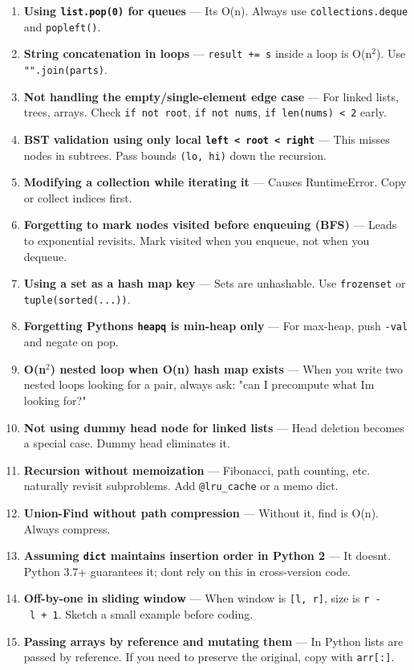 \documentclass[11pt]{article}
\begin{document}
\begin{enumerate}
\def\labelenumi{\arabic{enumi}.}
\item
  \textbf{Using \texttt{list.pop(0)} for queues} --- It\textquotesingle s O(n). Always use \texttt{collections.deque} and \texttt{popleft()}.
\item
  \textbf{String concatenation in loops} --- \texttt{result\ +=\ s} inside a loop is O(n\(^2\)). Use \texttt{"".join(parts)}.
\item
  \textbf{Not handling the empty/single-element edge case} --- For linked lists, trees, arrays. Check \texttt{if\ not\ root}, \texttt{if\ not\ nums}, \texttt{if\ len(nums)\ \textless{}\ 2} early.
\item
  \textbf{BST validation using only local \texttt{left\ \textless{}\ root\ \textless{}\ right}} --- This misses nodes in subtrees. Pass bounds \texttt{(lo,\ hi)} down the recursion.
\item
  \textbf{Modifying a collection while iterating it} --- Causes RuntimeError. Copy or collect indices first.
\item
  \textbf{Forgetting to mark nodes visited before enqueuing (BFS)} --- Leads to exponential revisits. Mark visited when you enqueue, not when you dequeue.
\item
  \textbf{Using a set as a hash map key} --- Sets are unhashable. Use \texttt{frozenset} or \texttt{tuple(sorted(...))}.
\item
  \textbf{Forgetting Python\textquotesingle s \texttt{heapq} is min-heap only} --- For max-heap, push \texttt{-val} and negate on pop.
\item
  \textbf{O(n\(^2\)) nested loop when O(n) hash map exists} --- When you write two nested loops looking for a pair, always ask: "can I precompute what I\textquotesingle m looking for?"
\item
  \textbf{Not using dummy head node for linked lists} --- Head deletion becomes a special case. Dummy head eliminates it.
\item
  \textbf{Recursion without memoization} --- Fibonacci, path counting, etc. naturally revisit subproblems. Add \texttt{@lru\_cache} or a memo dict.
\item
  \textbf{Union-Find without path compression} --- Without it, find is O(n). Always compress.
\item
  \textbf{Assuming \texttt{dict} maintains insertion order in Python 2} --- It doesn\textquotesingle t. Python 3.7+ guarantees it; don\textquotesingle t rely on this in cross-version code.
\item
  \textbf{Off-by-one in sliding window} --- When window is \texttt{{[}l,\ r{]}}, size is \texttt{r\ -\ l\ +\ 1}. Sketch a small example before coding.
\item
  \textbf{Passing arrays by reference and mutating them} --- In Python lists are passed by reference. If you need to preserve the original, copy with \texttt{arr{[}:{]}}.
\end{enumerate}
\end{document}
